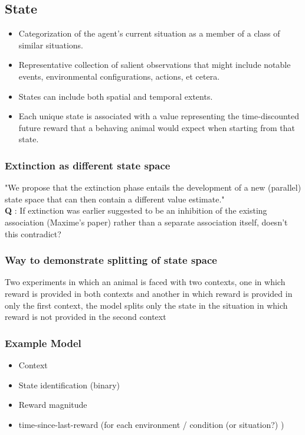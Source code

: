 \documentclass{article}
\begin{document}
\subsection{State}
\begin{itemize}
\item Categorization of the agent’s current situation as a member of a class of similar situations. 
\item Representative collection of salient observations that might include notable events, environmental configurations, actions, et cetera. 
\item States can include both spatial and temporal extents. 
\item Each unique state is associated with a value representing the time-discounted future reward that a behaving animal would expect when starting from that state.
\end{itemize}

\subsubsection{Extinction as different state space}
"We propose that the extinction phase entails the development of a new (parallel) state space that can then contain a different value estimate."\\
\textbf{Q} : If extinction was earlier suggested to be an inhibition of the existing association (Maxime's paper) rather than a separate association itself, doesn't this contradict?

\subsubsection{Way to demonstrate splitting of state space}
Two experiments in which an animal is faced with
two contexts, one in which reward is provided in both contexts and
another in which reward is provided in only the first context, the
model splits only the state in the situation in which reward is not
provided in the second context

\subsubsection{Example Model}
\begin{itemize}
\item Context 
\item State identification (binary)
\item Reward magnitude
\item time-since-last-reward (for each environment / condition (or situation?) )
\end{itemize}
\end{document}
